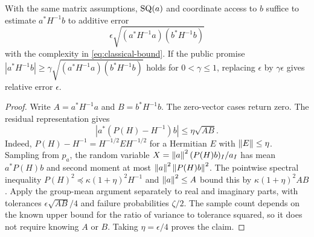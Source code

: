 \begin{corollary}\label{cor:bilinear}
With the same matrix assumptions, $\mathrm{SQ}(a)$ and coordinate access to $b$
suffice to estimate $a^*H^{-1}b$ to additive error
\[
       \epsilon\sqrt{(a^*H^{-1}a)(b^*H^{-1}b)}
\]
with the complexity in \eqref{eq:classical-bound}. If the public promise
$|a^*H^{-1}b|\geq\gamma\sqrt{(a^*H^{-1}a)(b^*H^{-1}b)}$ holds for
$0<\gamma\leq1$, replacing $\epsilon$ by $\gamma\epsilon$ gives relative
error $\epsilon$.
\end{corollary}
\begin{proof}
Write $A=a^*H^{-1}a$ and $B=b^*H^{-1}b$. The zero-vector cases return zero.
The residual representation gives
\[
 |a^*(P(H)-H^{-1})b|\leq\eta\sqrt{AB}.
\]
Indeed, $P(H)-H^{-1}=H^{-1/2}E H^{-1/2}$ for a Hermitian $E$ with
$\left\lVert E\right\rVert\leq\eta$. Sampling from $p_a$, the random variable
$X=\left\lVert a\right\rVert^2(P(H)b)_I/a_I$ has mean $a^*P(H)b$ and second moment at most
$\left\lVert a\right\rVert^2\left\lVert P(H)b\right\rVert^2$. The pointwise spectral inequality
$P(H)^2\preceq\kappa(1+\eta)^2H^{-1}$ and $\left\lVert a\right\rVert^2\leq A$ bound this
by $\kappa(1+\eta)^2AB$. Apply the group-mean argument separately to real
and imaginary parts, with tolerances $\epsilon\sqrt{AB}/4$ and failure
probabilities $\zeta/2$. The sample count depends on the known upper bound
for the ratio of variance to tolerance squared, so it does not require
knowing $A$ or $B$. Taking $\eta=\epsilon/4$ proves the claim.
\end{proof}

